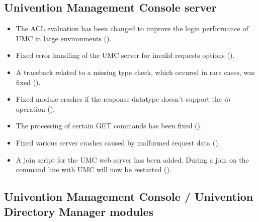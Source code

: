 \subsection{Univention Management Console server}
\begin{itemize}
\item The ACL evaluation has been changed to improve the login
  performance of UMC in large environments ().
\item Fixed error handling of the UMC server for invalid \ucsUCR{}
  requests options ().
\item A traceback related to a missing type check, which occured in
  rare cases, was fixed ().
\item Fixed module crashes if the response datatype doesn't
  support the \emph{in} operation ().
\item The processing of certain GET commands has been fixed
  ().
\item Fixed various server crashes caused by malformed request data
  ().
\item A join script for the UMC web server  has been added. During a
join on the command line with  UMC will now be
restarted ().
\end{itemize}

\subsection{Univention Management Console / Univention Directory
  Manager modules}


